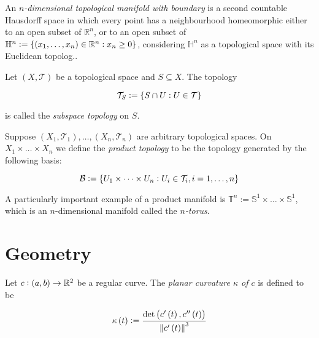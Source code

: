 \vspace{1mm}

\begin{definition}
	An \emph{$n$-dimensional topological manifold with boundary} is a second countable Hausdorff space in which every point has a neighbourhood homeomorphic either to an open subset of $\mathbb{R}^n$, or to an open subset of $\mathbb{H}^n := \cbr[0]{(x_1,\dots,x_n)\in \mathbb{R}^n : x_n \geq 0}$, considering $\mathbb{H}^n$ as a topological space with its Euclidean topolog..
\end{definition}

\vspace{1mm}

\begin{definition}
	Let $(X,\mathcal{T})$ be a topological space and $S \subseteq X$. The topology 

	\begin{equation}
		\mathcal{T}_S := \cbr[0]{S \cap U : U \in \mathcal{T}}
	\end{equation}

	\noindent is called the \emph{subspace topology} on $S$.
\end{definition}

\vspace{1mm}

\begin{definition}
	Suppose $(X_1,\mathcal{T}_1),\dots,(X_n,\mathcal{T}_n)$ are arbitrary topological spaces. On $X_1 \times \dots \times X_n$ we define the \emph{product topology} to be the topology generated by the following basis:

	\begin{equation}
		\mathcal{B} := \cbr[0]{U_1 \times \dots \times U_n : U_i \in \mathcal{T}_i, i= 1,\dots,n }
	\end{equation}
\end{definition}

\vspace{1mm}

\begin{example}
	A particularly important example of a product manifold is $\mathbb{T}^n := \mathbb{S}^1 \times \dots \times \mathbb{S}^1$, which is an $n$-dimensional manifold called the \emph{$n$-torus}.	
\end{example}

\vspace{1mm}




\section{Geometry}
\begin{definition}
	Let $c: \intoo{a,b} \to \mathbb{R}^2$ be a regular curve. The \emph{planar curvature $\kappa$ of $c$} is defined to be

	\begin{equation}
		\kappa\del{t} := \frac{\det\del{c'\del{t},c''\del{t}}}{\norm[0]{c'\del{t}}^3}	
	\end{equation}
\end{definition}

